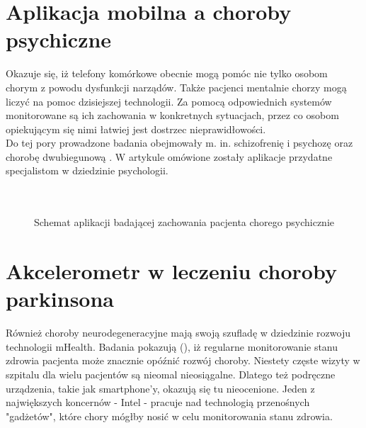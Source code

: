 \section{Aplikacja mobilna a choroby psychiczne}
Okazuje się, iż telefony komórkowe obecnie mogą pomóc nie tylko osobom chorym z powodu dysfunkcji narządów. Także pacjenci mentalnie chorzy mogą liczyć na pomoc dzisiejszej technologii. Za pomocą odpowiednich systemów monitorowane są ich zachowania w konkretnych sytuacjach, przez co osobom opiekującym się nimi łatwiej jest dostrzec nieprawidłowości.\\
Do tej pory prowadzone badania obejmowały m. in. schizofrenię i psychozę oraz chorobę dwubiegunową \cite{IJOMHSPawelProciow2012Mobilepsychiatry:towardsimprovingthecareforbipolardisorderScience&TechnologyLifeSciences&BiomedicinePsychiatryPSYCHIATRYSSCIAMBULATORYASSESSMENTCIRCADIAN-RHYTHMSMENTAL-DISORDERSDAILY-LIFEPSYCHOLOGYCREATIVITYMOVEMENTBURDENSLEEP}. W artykule \cite{JoPNHSElias2014MobileAppsforPsychiatricNursesPsychiatric-mentalhealthnursingSmartphonesHandheldcomputersSoftware} omówione zostały aplikacje przydatne specjalistom w dziedzinie psychologii. \\ \\ \\
\begin{figure}[ht!]
  \centering
  \caption{Schemat aplikacji badającej zachowania pacjenta chorego psychicznie}
\end{figure}
\section{Akcelerometr  w leczeniu choroby parkinsona}
Również choroby neurodegeneracyjne mają swoją szufladę w dziedzinie rozwoju technologii mHealth. Badania pokazują (\cite{AICPSSanders2013RemotesmartphonemonitoringformanagementofParkinsonsDiseaseEEGaccelerationactivitymonitoringelectroencephalogrammobilecomputingsensorsmart-phonewatchwrist}), iż regularne monitorowanie stanu zdrowia pacjenta może znacznie opóźnić rozwój choroby. Niestety częste wizyty w szpitalu dla wielu pacjentów są nieomal nieosiągalne. Dlatego też podręczne urządzenia, takie jak smartphone'y, okazują się tu nieocenione. Jeden z największych koncernów - Intel \cite{BMacKellar2014AussiemhealthfirmtorollouttoolforParkinsons} - pracuje nad technologią przenośnych "gadżetów", które chory mógłby nosić w celu monitorowania stanu zdrowia.
